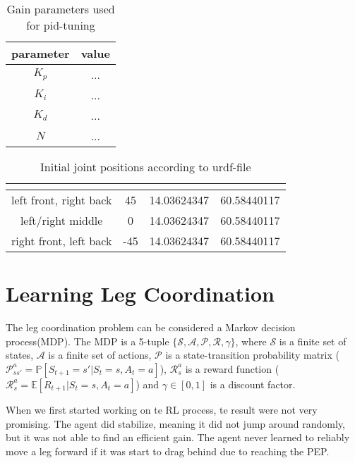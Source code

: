\begin{table}[h]
	\centering
	\begin{tabular}{| c | c |}
		\hline
		parameter & value\\
		\hline
		$K_p$ & ... \\
		\hline
		$K_i$ & ... \\
		\hline
		$K_d$ & ... \\
		\hline
		$N$ & ... \\
		\hline
	\end{tabular}
	\caption{Gain parameters used for pid-tuning}
	\label{table: PID parameters}
\end{table}

\begin{table}
	\centering
	\begin{tabular}{| c | c | c | c |} 
		\hline
		 & \textbf{\textalpha} & \textbf{\textbeta} & \textbf{\textgamma} \\ [0.5ex] 
		\hline
		left front, right back & 45 & 14.03624347 & 60.58440117  \\ 
		\hline
		left/right middle & 0 & 14.03624347 & 60.58440117 \\
		\hline
		right front, left back & -45 & 14.03624347 & 60.58440117 \\
		\hline
	\end{tabular}
	\caption{Initial joint positions according to urdf-file}
	\label{table:Initial joint positions}
\end{table}



\section{Learning Leg Coordination}
The leg coordination problem can be considered a Markov decision process(MDP).
The MDP is a 5-tuple $\mathcal{\{S,A,P,R,\gamma\}}$, where $\mathcal{S}$ is a finite set of states, $\mathcal{A}$ is a finite set of actions, $\mathcal{P}$ is a state-transition probability matrix ($\mathcal{P}_{ss'}^a=\mathbb{P}[S_{t+1}=s' | S_t=s, A_t=a]$), $\mathcal{R}_s^a$ is a reward function ($\mathcal{R}_s^a = \mathbb{E}[R_{t+1} | S_t=s, A_t=a]$) and $\gamma \in [0,1]$ is a discount factor.


When we first started working on te RL process, te result were not very promising. The agent did stabilize, meaning it did not jump around randomly, but it was not able to find an efficient gain.
The agent never learned to reliably move a leg forward if it was start to drag behind due to reaching the PEP.


